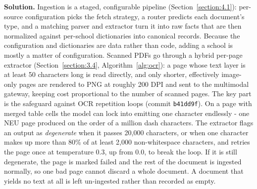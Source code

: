 \documentclass[../main.tex]{subfiles}
\begin{document}
\textbf{Solution.}
Ingestion is a staged, configurable pipeline (Section~\ref{section:4.1}): per-source configuration picks the fetch strategy, a router predicts each document's type, and a matching parser and extractor turn it into raw facts that are then normalized against per-school dictionaries into canonical records.
Because the configuration and dictionaries are data rather than code, adding a school is mostly a matter of configuration.
Scanned \gls{PDF}s go through a hybrid per-page extractor (Section~\ref{section:3.4}, Algorithm~\ref{alg:ocr}): a page whose text layer is at least 50 characters long is read directly, and only shorter, effectively image-only pages are rendered to PNG at roughly 200 \gls{DPI} and sent to the multimodal gateway, keeping cost proportional to the number of scanned pages.
The key part is the safeguard against \gls{OCR} repetition loops (commit \texttt{b41dd9f}).
On a page with merged table cells the model can lock into emitting one character endlessly - one NEU page produced on the order of a million dash characters.
The extractor flags an output as \textit{degenerate} when it passes 20{,}000 characters, or when one character makes up more than 80\% of at least 2{,}000 non-whitespace characters, and retries the page once at temperature 0.3, up from 0.0, to break the loop.
If it is still degenerate, the page is marked failed and the rest of the document is ingested normally, so one bad page cannot discard a whole document.
A document that yields no text at all is left un-ingested rather than recorded as empty.

\begin{algorithm}[H]
\caption{Hybrid per-page extraction with degenerate-OCR detection}
\label{alg:ocr}
\BlankLine
{}
\end{algorithm}
\end{document}
